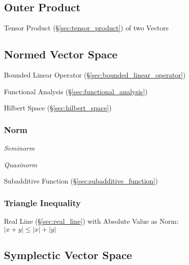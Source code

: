\subsection{Outer Product}\label{sec:outer_product}

Tensor Product (\S\ref{sec:tensor_product}) of two Vectors



\subsection{Normed Vector Space}\label{sec:normed_vectorspace}

Bounded Linear Operator (\S\ref{sec:bounded_linear_operator})

Functional Analysis (\S\ref{sec:functional_analysis})

Hilbert Space (\S\ref{sec:hilbert_space})



\subsubsection{Norm}\label{sec:norm}

\emph{Seminorm}

\emph{Quasinorm}

Subadditive Function (\S\ref{sec:subadditive_function})



\subsubsection{Triangle Inequality}\label{sec:triangle_inequality}

Real Line (\S\ref{sec:real_line}) with Absolute Value as Norm:\\
$|x + y| \leq |x| + |y|$



\subsection{Symplectic Vector Space}\label{sec:symplectic_vectorspace}

